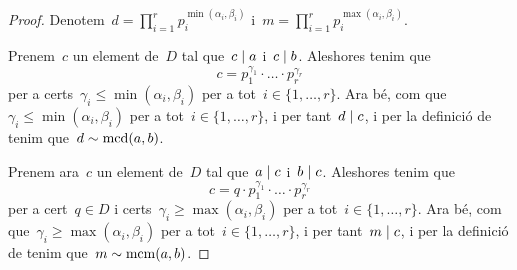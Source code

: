 \documentclass[../../main.tex]{subfiles}
\begin{document}
    \begin{proof}
        Denotem~\(d=\prod_{i=1}^{r}p_{i}^{\min(\alpha_{i},\beta_{i})}\) i~\(m=\prod_{i=1}^{r}p_{i}^{\max(\alpha_{i},\beta_{i})}\).

        Prenem~\(c\) un element de~\(D\) tal que~\(c\mathrel{|} a\) i~\(c\mathrel{|} b\).
        Aleshores tenim que
        \[
            c=p_{1}^{\gamma_{1}}\cdot\ldots\cdot p_{r}^{\gamma_{r}}
        \]
        per a certs~\(\gamma_{i}\leq\min(\alpha_{i},\beta_{i})\) per a tot~\(i\in\{1,\dots,r\}\).
        Ara bé, com que~\(\gamma_{i}\leq\min(\alpha_{i},\beta_{i})\) per a tot~\(i\in\{1,\dots,r\}\), i per tant~\(d\mathrel{|} c\), i per la definició de  tenim que~\(d\sim\operatorname{mcd}(a,b)\).

        Prenem ara~\(c\) un element de~\(D\) tal que~\(a\mathrel{|} c\) i~\(b\mathrel{|} c\).
        Aleshores tenim que
        \[
            c=q\cdot p_{1}^{\gamma_{1}}\cdot\ldots\cdot p_{r}^{\gamma_{r}}
        \]
        per a cert~\(q\in D\) i certs~\(\gamma_{i}\geq\max(\alpha_{i},\beta_{i})\) per a tot~\(i\in\{1,\dots,r\}\).
        Ara bé, com que~\(\gamma_{i}\geq\max(\alpha_{i},\beta_{i})\) per a tot~\(i\in\{1,\dots,r\}\), i per tant~\(m\mathrel{|} c\), i per la definició de  tenim que~\(m\sim\operatorname{mcm}(a,b)\).
    \end{proof}
\end{document}

